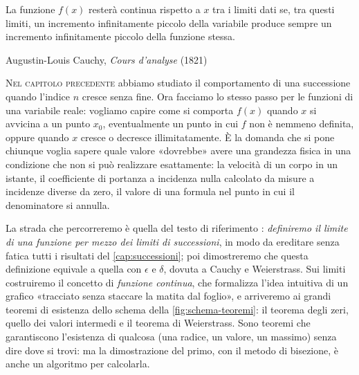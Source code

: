 
\epigraph{La funzione $f(x)$ resterà continua rispetto a $x$ tra i limiti dati se, tra
questi limiti, un incremento infinitamente piccolo della variabile produce sempre un
incremento infinitamente piccolo della funzione stessa.}{Augustin-Louis Cauchy,
\emph{Cours d'analyse} (1821)}

\lettrine[lines=3, findent=2pt, nindent=0pt]{N}{el capitolo precedente} abbiamo studiato
il comportamento di una successione quando l'indice $n$ cresce senza fine. Ora facciamo
lo stesso passo per le funzioni di una variabile reale: vogliamo capire come si comporta
$f(x)$ quando $x$ si avvicina a un punto $x_{0}$, eventualmente un punto in cui $f$ non è
nemmeno definita, oppure quando $x$ cresce o decresce illimitatamente. È la domanda che
si pone chiunque voglia sapere quale valore «dovrebbe» avere una grandezza fisica in una
condizione che non si può realizzare esattamente: la velocità di un corpo in un istante,
il coefficiente di portanza a incidenza nulla calcolato da misure a incidenze diverse da
zero, il valore di una formula nel punto in cui il denominatore si annulla.

La strada che percorreremo è quella del testo di riferimento \cite{marcellini-sbordone}:
\emph{definiremo il limite di una funzione per mezzo dei limiti di successioni}, in modo
da ereditare senza fatica tutti i risultati del \cref{cap:successioni}; poi
dimostreremo che questa definizione equivale a quella con $\epsilon$ e $\delta$, dovuta a
Cauchy e Weierstrass. Sui limiti costruiremo il concetto di \emph{funzione continua},
che formalizza l'idea intuitiva di un grafico «tracciato senza staccare la matita dal
foglio», e arriveremo ai grandi teoremi di esistenza dello schema della
\cref{fig:schema-teoremi}: il teorema degli zeri, quello dei valori intermedi e il
teorema di Weierstrass. Sono teoremi che garantiscono l'esistenza di qualcosa (una
radice, un valore, un massimo) senza dire dove si trovi: ma la dimostrazione del primo,
con il metodo di bisezione, è anche un algoritmo per calcolarla.

